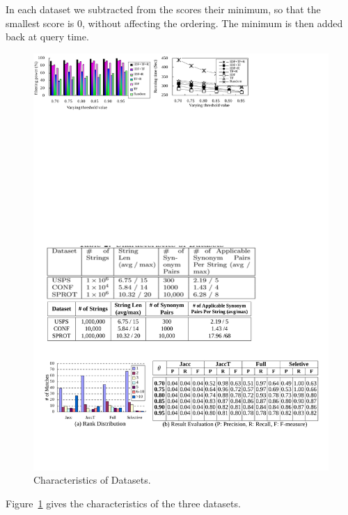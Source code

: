 In each dataset we subtracted from the scores their minimum,
so that the smallest score is 0, without affecting the
ordering. The minimum is then added back at query time.




\begin{figure}
  \small
  \centering
  \includegraphics[width=\linewidth]{figures/Characteristics_Datasets}
   \vspace{-6mm}
  \caption{Characteristics of Datasets.}
  \label{tab:data_characteristics}
\end{figure}


Figure~\ref{tab:data_characteristics} gives the characteristics of the
three datasets.
